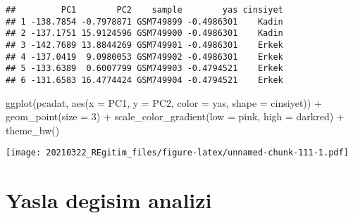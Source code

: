 \documentclass[
]{book}
\newenvironment{Shaded}{\begin{snugshade}}{\end{snugshade}}
\newcommand{\AttributeTok}[1]{\textcolor[rgb]{0.77,0.63,0.00}{#1}}
\newcommand{\DecValTok}[1]{\textcolor[rgb]{0.00,0.00,0.81}{#1}}
\newcommand{\FunctionTok}[1]{\textcolor[rgb]{0.00,0.00,0.00}{#1}}
\newcommand{\NormalTok}[1]{#1}
\newcommand{\OtherTok}[1]{\textcolor[rgb]{0.56,0.35,0.01}{#1}}
\newcommand{\SpecialCharTok}[1]{\textcolor[rgb]{0.00,0.00,0.00}{#1}}
\newcommand{\StringTok}[1]{\textcolor[rgb]{0.31,0.60,0.02}{#1}}
\begin{document}
\begin{Shaded}
\end{Shaded}

\begin{verbatim}
##         PC1        PC2    sample        yas cinsiyet
## 1 -138.7854 -0.7978871 GSM749899 -0.4986301    Kadin
## 2 -137.1751 15.9124596 GSM749900 -0.4986301    Kadin
## 3 -142.7689 13.8844269 GSM749901 -0.4986301    Erkek
## 4 -137.0419  9.0980053 GSM749902 -0.4986301    Erkek
## 5 -133.6389  0.6007799 GSM749903 -0.4794521    Erkek
## 6 -131.6583 16.4774424 GSM749904 -0.4794521    Erkek
\end{verbatim}

\begin{Shaded}
\begin{Highlighting}[]
\FunctionTok{ggplot}\NormalTok{(pcadat, }\FunctionTok{aes}\NormalTok{(}\AttributeTok{x =}\NormalTok{ PC1, }\AttributeTok{y =}\NormalTok{ PC2, }\AttributeTok{color =}\NormalTok{ yas, }\AttributeTok{shape =}\NormalTok{ cinsiyet)) }\SpecialCharTok{+}
  \FunctionTok{geom\_point}\NormalTok{(}\AttributeTok{size =} \DecValTok{3}\NormalTok{) }\SpecialCharTok{+}
  \FunctionTok{scale\_color\_gradient}\NormalTok{(}\AttributeTok{low =} \StringTok{\textquotesingle{}pink\textquotesingle{}}\NormalTok{, }\AttributeTok{high =} \StringTok{\textquotesingle{}darkred\textquotesingle{}}\NormalTok{) }\SpecialCharTok{+}
  \FunctionTok{theme\_bw}\NormalTok{()}
\end{Highlighting}
\end{Shaded}

\texttt{[image: 20210322\_REgitim\_files/figure-latex/unnamed-chunk-111-1.pdf]}

\hypertarget{yasla-degisim-analizi}{%
\chapter{Yasla degisim analizi}\label{yasla-degisim-analizi}}
\end{document}
